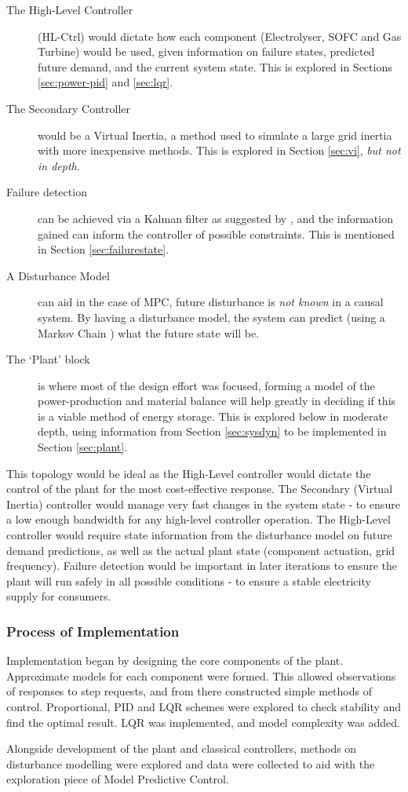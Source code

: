 \begin{description}
        \item[The High-Level Controller] (HL-Ctrl) would dictate how each component (Electrolyser, SOFC and Gas Turbine) would be used, given information on failure states, predicted future demand, and the current system state. This is explored in Sections \ref{sec:power-pid} and \ref{sec:lqr}.
        \item[The Secondary Controller] would be a Virtual Inertia, a method used to simulate a large grid inertia with more inexpensive methods. {This is explored in Section \ref{sec:vi}, \emph{but not in depth.}}
        \item[Failure detection] can be achieved via a Kalman filter as suggested by \cite{power:kalman}, and the information gained can inform the controller of possible constraints. {This is mentioned in Section \ref{sec:failurestate}.}
        \item[A Disturbance Model] can aid in the case of MPC, future disturbance is \emph{not known} in a causal system. By having a disturbance model, the system can predict (using a Markov Chain \cite{power:markovP}) what the future state will be.
        \item[The `Plant' block] is where most of the design effort was focused, forming a model of the power-production and material balance will help greatly in deciding if this is a viable method of energy storage. {This is explored below in moderate depth, using information from Section \ref{sec:sysdyn} to be implemented in Section \ref{sec:plant}.}
\end{description}

This topology would be ideal as the High-Level controller would dictate the control of the plant for the most cost-effective response.
The Secondary (Virtual Inertia) controller would manage very fast changes in the system state - to ensure a low enough bandwidth for any high-level controller operation.
The High-Level controller would require state information from the disturbance model on future demand predictions, as well as the actual plant state (component actuation, grid frequency).
Failure detection would be important in later iterations to ensure the plant will run safely in all possible conditions - to ensure a stable electricity supply for consumers.

\subsubsection{Process of Implementation}

Implementation began by designing the core components of the plant.
Approximate models for each component were formed.
This allowed observations of responses to step requests, and from there constructed simple methods of control.
Proportional, PID and LQR schemes were explored to check stability and find the optimal result.
LQR was implemented, and model complexity was added.

Alongside development of the plant and classical controllers, methods on disturbance modelling were explored and data were collected to aid with the exploration piece of Model Predictive Control.
